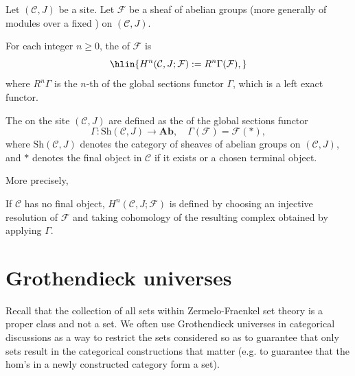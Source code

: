 \begin{definition}
Let $(\mathcal{C}, J)$ be a site. Let $\mathcal{F}$ be a sheaf of abelian groups (more generally of modules over a fixed ) on $(\mathcal{C}, J)$.

For each integer $n \geq 0$, the  of $\mathcal{F}$ is
$$\hlin{H^n(\mathcal{C}, J; \mathcal{F}) := R^n \Gamma(\mathcal{F}),}$$
where $R^n \Gamma$ is the $n$-th  of the global sections functor $\Gamma$, which is a left exact functor.


The  on the site $(\mathcal{C}, J)$ are defined as the  of the global sections functor
$$\Gamma : \mathrm{Sh}(\mathcal{C}, J) \to \mathbf{Ab}, \quad \Gamma(\mathcal{F}) = \mathcal{F}(\ast),$$
where $\mathrm{Sh}(\mathcal{C}, J)$ denotes the category of sheaves of abelian groups on $(\mathcal{C}, J)$, and $\ast$ denotes the final object in $\mathcal{C}$ if it exists or a chosen terminal object.

More precisely, 

If $\mathcal{C}$ has no final object, $H^n(\mathcal{C}, J; \mathcal{F})$ is defined by choosing an injective resolution of $\mathcal{F}$ and taking cohomology of the resulting complex obtained by applying $\Gamma$.

\end{definition}


\appendix

\section{Grothendieck universes}

Recall that the collection of all sets within Zermelo-Fraenkel set theory is a proper class and not a set. We often use Grothendieck universes in categorical discussions as a way to restrict the sets considered so as to guarantee that only sets result in the categorical constructions that matter (e.g. to guarantee that the hom's in a newly constructed category form a set).

